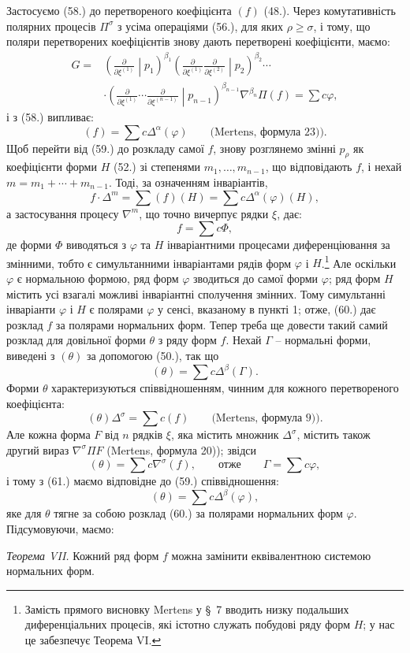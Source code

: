 \documentclass[11pt]{article}
\begin{document}
Застосуємо (58.) до перетвореного коефіцієнта $(f)$ (48.). Через комутативність полярних процесів $\Pi^\sigma$ з усіма операціями (56.), для яких $\rho\ge\sigma$, і тому, що поляри перетворених коефіцієнтів знову дають перетворені коефіцієнти, маємо:
\[
\begin{aligned}
G={}&\left(\frac{\partial}{\partial\xi^{(1)}}\middle|p_1\right)^{\beta_1}
\left(\frac{\partial}{\partial\xi^{(1)}}\frac{\partial}{\partial\xi^{(2)}}\middle|p_2\right)^{\beta_2}\cdots\\
&\cdot
\left(\frac{\partial}{\partial\xi^{(1)}}\cdots\frac{\partial}{\partial\xi^{(n-1)}}\middle|p_{n-1}\right)^{\beta_{n-1}}
\nabla^{\beta_n}\Pi(f)=\sum c\varphi,
\end{aligned}
\]
і з (58.) випливає:
\begin{equation}
 (f)=\sum c\Delta^\alpha(\varphi)\qquad\text{(Mertens, формула 23)).}
\tag{59}
\end{equation}
Щоб перейти від (59.) до розкладу самої $f$, знову розглянемо змінні $p_\rho$ як коефіцієнти форми $H$ (52.) зі степенями $m_1,\ldots,m_{n-1}$, що відповідають $f$, і нехай $m=m_1+\cdots+m_{n-1}$. Тоді, за означенням інваріантів,
\[
 f\cdot\Delta^m=\sum(f)(H)=\sum c\Delta^\alpha(\varphi)(H),
\]
а застосування процесу $\nabla^m$, що точно вичерпує рядки $\xi$, дає:
\begin{equation}
 f=\sum c\Phi,
\tag{60}
\end{equation}
де форми $\Phi$ виводяться з $\varphi$ та $H$ інваріантними процесами диференціювання за змінними, тобто є симультанними інваріантами рядів форм $\varphi$ і $H$.\footnote{Замість прямого висновку Mertens у \S\ 7 вводить низку подальших диференціальних процесів, які істотно служать побудові ряду форм $H$; у нас це забезпечує Теорема VI.} Але оскільки $\varphi$ є нормальною формою, ряд форм $\varphi$ зводиться до самої форми $\varphi$; ряд форм $H$ містить усі взагалі можливі інваріантні сполучення змінних. Тому симультанні інваріанти $\varphi$ і $H$ є полярами $\varphi$ у сенсі, вказаному в пункті 1; отже, (60.) дає розклад $f$ за полярами нормальних форм. Тепер треба ще довести такий самий розклад для довільної форми $\theta$ з ряду форм $f$. Нехай $\Gamma$ -- нормальні форми, виведені з $(\theta)$ за допомогою (50.), так що
\begin{equation}
 (\theta)=\sum c\Delta^\beta(\Gamma).
\tag{61}
\end{equation}
Форми $\theta$ характеризуються співвідношенням, чинним для кожного перетвореного коефіцієнта:
\[
 (\theta)\Delta^\sigma=\sum c(f)\qquad\text{(Mertens, формула 9)).}
\]
Але кожна форма $F$ від $n$ рядків $\xi$, яка містить множник $\Delta^\sigma$, містить також другий вираз $\nabla^\sigma\Pi F$ (Mertens, формула 20)); звідси
\[
 (\theta)=\sum c\nabla^\sigma(f),\qquad\text{отже}\qquad \Gamma=\sum c\varphi,
\]
і тому з (61.) маємо відповідне до (59.) співвідношення:
\[
 (\theta)=\sum c\Delta^\beta(\varphi),
\]
яке для $\theta$ тягне за собою розклад (60.) за полярами нормальних форм $\varphi$. Підсумовуючи, маємо:

\emph{Теорема VII.} Кожний ряд форм $f$ можна замінити еквівалентною системою нормальних форм.
\end{document}
